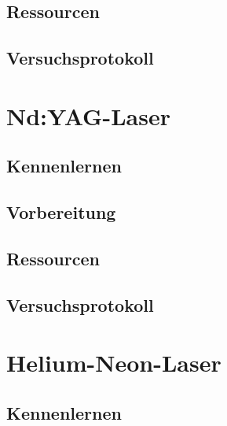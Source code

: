 \documentclass[
    twoside=true, 
    footinclude=off, 
    captions=tableheading, 
    DIV=12;usenames,
    dvipsnames
]{scrbook}
\begin{document}
    \newpage
    \section{Ressourcen}
        

    \newpage
    \section{Versuchsprotokoll}
        

\chapter{Nd:YAG-Laser}
    \section{Kennenlernen}
        

    \newpage
    \section{Vorbereitung}
        

    \newpage
    \section{Ressourcen}
        

    \newpage
    \section{Versuchsprotokoll}
        


    


\chapter{Helium-Neon-Laser}
    \section{Kennenlernen}
        
\end{document}
